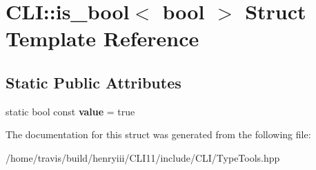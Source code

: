 \hypertarget{struct_c_l_i_1_1is__bool_3_01bool_01_4}{}\section{C\+LI\+:\+:is\+\_\+bool$<$ bool $>$ Struct Template Reference}
\label{struct_c_l_i_1_1is__bool_3_01bool_01_4}
\subsection*{Static Public Attributes}
\begin{DoxyCompactItemize}
\item 
\mbox{\label{struct_c_l_i_1_1is__bool_3_01bool_01_4_a54d8224c914b3935d8e827c7f1775a8e}} 
static bool const {\bfseries value} = true
\end{DoxyCompactItemize}


The documentation for this struct was generated from the following file\+:\begin{DoxyCompactItemize}
\item 
/home/travis/build/henryiii/\+C\+L\+I11/include/\+C\+L\+I/Type\+Tools.\+hpp\end{DoxyCompactItemize}
